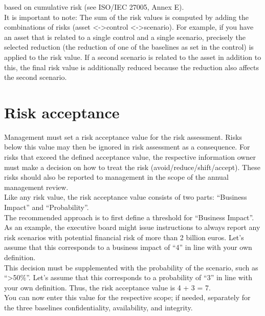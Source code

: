 \documentclass[a4paper,10pt]{book}
\begin{document}
based on cumulative risk (see ISO/IEC 27005, Annex E).
\newline\\
It is important to note: The sum of the risk values is computed by adding the combinations of risks
(asset \textless-\textgreater control \textless-\textgreater scenario). For example, if you have an asset that is related to a single control
and a single scenario, precisely the selected reduction (the reduction of one of the baselines as set in the control)
is applied to the risk value. If a second scenario is related to the asset in addition to this, the final risk value
is additionally reduced because the reduction also affects the second scenario.

\section{Risk acceptance}
Management must set a risk acceptance value for the risk assessment. Risks below this value may then be ignored in
risk assessment as a consequence. For risks that exceed the defined acceptance value, the respective information
owner must make a decision on how to treat the risk (avoid/reduce/shift/accept). These risks should also be reported
to management in the scope of the annual management review.
\newline\\
Like any risk value, the risk acceptance value consists of two parts: ``Business Impact'' and ``Probability''.
\newline\\
The recommended approach is to first define a threshold for ``Business Impact''. As an example, the executive board
might issue instructions to always report any risk scenarios with potential financial risk of more than 2 billion
euros. Let's assume that this corresponds to a business impact of ``4'' in line with your own definition.
\newline\\
This decision must be supplemented with the probability of the scenario, such as ``\textgreater50\%''.
Let's assume that this corresponds to a probability of ``3'' in line with your own definition. Thus, the
risk acceptance value is 4 + 3 = 7.
\newline\\
You can now enter this value for the respective scope; if needed, separately for the three baselines
confidentiality, availability, and integrity.\\
\end{document}
